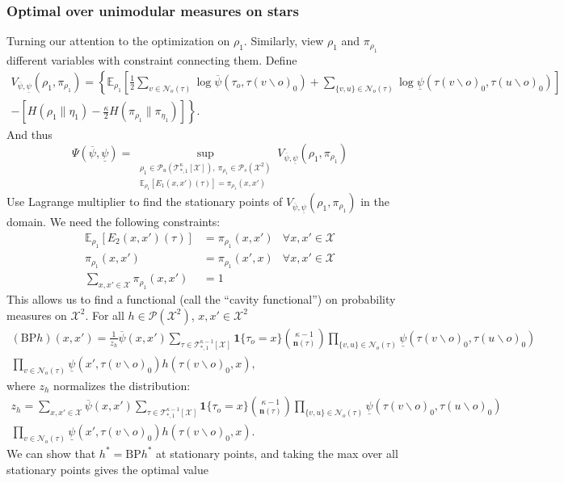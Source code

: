\documentclass[12pt]{article}
\newcommand{\BS}{\backslash}
\newcommand{\X}{{\mathcal{X}}}
\newcommand{\PP}{{\mathcal{P}}}
\newcommand{\TT}{{\mathcal{T}}}
\newcommand{\EE}{{\mathbb{E}}}
\newcommand{\PO}{{\overline{\psi}}}
\newcommand{\PU}{{\underline{\psi}}}
\newcommand{\CF}{{h}}
\newcommand{\CFo}{{h^*}}
\newcommand{\AP}{{\Psi}}
\newcommand{\VAL}{{V_{\PO, \PU}}}
\newcommand{\one}[1]{\mathbf{1}\{#1\}}
\newcommand{\tree}[2]{\TT_{*, #1}^{#2}[\X]}
\newcommand{\mSs}{\PP_u(\TT_{*, 1}^{\kappa}[\X])}
\newcommand{\mEs}{\PP_s(\X^2)}
\newcommand{\CNT}{{\mathbf{n}}}
\newcommand{\BP}{{\text{BP}}}
\newcommand{\Ss}{{\rho_1}}
\newcommand{\SUs}{{\eta_1}}
\newcommand{\Es}{{\pi_\Ss}}
\newcommand{\EUs}{{\pi_\SUs}}
\newcommand{\NB}[1]{{\mathcal{N}_o(#1)}}
\numberwithin{equation}{section}
\begin{document}
\subsubsection*{Optimal over unimodular measures on stars}
Turning our attention to the optimization on $\Ss$. Similarly, view $\Ss$ and $\Es$ different variables with constraint connecting them. Define
\begin{multline}
    \VAL(\Ss, \Es) = \left\{\EE_\Ss\left[\frac12\sum_{v\in\NB{\tau}}\log\PO(\tau_o, \tau(v\BS o)_0)+\sum_{\{v, u\}\in\NB{\tau}}\log\PU(\tau(v\BS o)_0, \tau(u\BS o)_0)\right] \right. \\
    \left.- \left[H(\Ss\|\SUs) - \frac{\kappa}{2} H(\Es\|\EUs)\right]\right\}.
\end{multline}
And thus
\begin{equation*}
    \AP(\PO, \PU) = \sup_{\substack{\Ss\in\mSs,\ \Es\in\mEs\\ \EE_\Ss[E_1(x,x')(\tau)]=\Es(x, x')}} \VAL(\Ss, \Es)
\end{equation*}
Use Lagrange multiplier to find the stationary points of $\VAL(\Ss, \Es)$ in the domain. We need the following constraints:
\begin{align*}
    \EE_\Ss\left[E_2(x, x')(\tau)\right] & = \Es(x, x') & \forall x, x'\in\X \\
    \Es(x, x')                           & = \Es(x', x) & \forall x, x'\in\X \\
    \sum_{x,x'\in\X}\Es(x, x')           & = 1
\end{align*}
This allows us to find a functional (call the ``cavity functional'') on probability measures on $\X^2$. For all $\CF\in\PP(\X^2)$, $x, x'\in\X^2$
\begin{multline}
    (\BP\CF)(x, x') = \frac{1}{z_\CF} \PO(x, x') \sum_{\tau\in\tree{1}{\kappa-1}} \one{\tau_o=x}{\kappa-1\choose\CNT(\tau)}\prod_{\{v, u\}\in\NB{\tau}}\PU(\tau(v\BS o)_0, \tau(u\BS o)_0)\\
    \prod_{v\in\NB{\tau}} \PU(x', \tau(v\BS o)_0) \CF(\tau(v\BS o)_0, x),
\end{multline}
where $z_\CF$ normalizes the distribution:
\begin{multline}
    z_\CF = \sum_{x, x'\in\X}\PO(x, x') \sum_{\tau\in\tree{1}{\kappa-1}} \one{\tau_o=x}{\kappa-1\choose\CNT(\tau)}\prod_{\{v, u\}\in\NB{\tau}}\PU(\tau(v\BS o)_0, \tau(u\BS o)_0)\\
    \prod_{v\in\NB{\tau}} \PU(x', \tau(v\BS o)_0) \CF(\tau(v\BS o)_0, x).
\end{multline}
We can show that $\CFo=\BP\CFo$ at stationary points, and taking the max over all stationary points gives the optimal value
\end{document}
